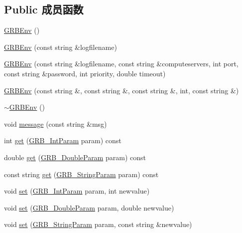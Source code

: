 \subsection*{Public 成员函数}
\begin{DoxyCompactItemize}
\item 
\hyperlink{classGRBEnv_ae83989a2de3dc8269e07ff86268e6307}{G\+R\+B\+Env} ()
\item 
\hyperlink{classGRBEnv_a7ab5f47660f638645913c694c1a38deb}{G\+R\+B\+Env} (const string \&logfilename)
\item 
\hyperlink{classGRBEnv_a472e887a6f907dd3841cb82db19b8224}{G\+R\+B\+Env} (const string \&logfilename, const string \&computeservers, int port, const string \&password, int priority, double timeout)
\item 
\hyperlink{classGRBEnv_a70a83b789fc3307063f0a269ae154482}{G\+R\+B\+Env} (const string \&, const string \&, const string \&, int, const string \&)
\item 
\hyperlink{classGRBEnv_a1f17093649616f37cf594604a003cd64}{$\sim$\+G\+R\+B\+Env} ()
\item 
void \hyperlink{classGRBEnv_a767efd5ec6946c463d4f49eaf98ebc5b}{message} (const string \&msg)
\item 
int \hyperlink{classGRBEnv_a2110323bbc642797af268cda5cae230f}{get} (\hyperlink{gurobi__c_09_09_8h_ab02a171b88b53892fce22c6426a9d166}{G\+R\+B\+\_\+\+Int\+Param} param) const 
\item 
double \hyperlink{classGRBEnv_a1cd6e05d94ee1154f73818a3f7a0a677}{get} (\hyperlink{gurobi__c_09_09_8h_a4703eabc6bd97595ee1d0b3241981772}{G\+R\+B\+\_\+\+Double\+Param} param) const 
\item 
const string \hyperlink{classGRBEnv_ac866810468b30710288554338d4681f6}{get} (\hyperlink{gurobi__c_09_09_8h_a7ed46434ddcd973e46a3acd4d6c2cf04}{G\+R\+B\+\_\+\+String\+Param} param) const 
\item 
void \hyperlink{classGRBEnv_a7f3ec7e37fbed1c7606ea52e18ed8a95}{set} (\hyperlink{gurobi__c_09_09_8h_ab02a171b88b53892fce22c6426a9d166}{G\+R\+B\+\_\+\+Int\+Param} param, int newvalue)
\item 
void \hyperlink{classGRBEnv_a6f2c82571e7c901f796e3b8f673988cb}{set} (\hyperlink{gurobi__c_09_09_8h_a4703eabc6bd97595ee1d0b3241981772}{G\+R\+B\+\_\+\+Double\+Param} param, double newvalue)
\item 
void \hyperlink{classGRBEnv_a802a1623a34bebb9171452db16753920}{set} (\hyperlink{gurobi__c_09_09_8h_a7ed46434ddcd973e46a3acd4d6c2cf04}{G\+R\+B\+\_\+\+String\+Param} param, const string \&newvalue)

\end{DoxyCompactItemize}
